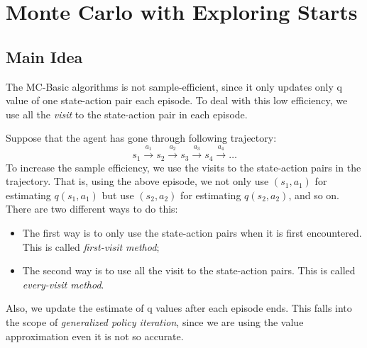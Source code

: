 \section{Monte Carlo with Exploring Starts}
    \subsection{Main Idea}
        The MC-Basic algorithms is not sample-efficient, since it only updates only q value of
        one state-action pair each episode. To deal with this low efficiency, we use all the
        \emph{visit} to the state-action pair in each episode.
        
        Suppose that the agent has gone through following trajectory:
        \begin{equation}
            s_1 \xrightarrow{a_1} s_2 \xrightarrow{a_2} s_3 \xrightarrow{a_3} s_4 \xrightarrow{a_4} \dots
        \end{equation}
        To increase the sample efficiency, we use the visits to the state-action pairs in the trajectory.
        That is, using the above episode, we not only use $(s_1,a_1)$ for estimating $q(s_1,a_1)$ but use $(s_2,a_2)$ for estimating $q(s_2,a_2)$, and so on.
        There are two different ways to do this:
        \begin{itemize}
            \item The first way is to only use the state-action pairs when it is first encountered. This is called \emph{first-visit method};
            \item The second way is to use all the visit to the state-action pairs. This is called \emph{every-visit method}.
        \end{itemize}

        Also, we update the estimate of q values after each episode ends. This falls into the scope of \emph{generalized policy iteration},
        since we are using the value approximation even it is not so accurate.
